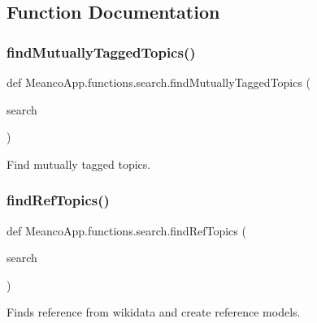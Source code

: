 \subsection{Function Documentation}
\hypertarget{namespace_meanco_app_1_1functions_1_1search_a586e968398f8f8a93016191459cacd60}{}\label{namespace_meanco_app_1_1functions_1_1search_a586e968398f8f8a93016191459cacd60} 
\subsubsection{\texorpdfstring{find\+Mutually\+Tagged\+Topics()}{findMutuallyTaggedTopics()}}
{\footnotesize\ttfamily def Meanco\+App.\+functions.\+search.\+find\+Mutually\+Tagged\+Topics (\begin{DoxyParamCaption}\item[{}]{search }\end{DoxyParamCaption})}



Find mutually tagged topics. 

\hypertarget{namespace_meanco_app_1_1functions_1_1search_ad033c051ea9ae6c4a1256ada1392ad18}{}\label{namespace_meanco_app_1_1functions_1_1search_ad033c051ea9ae6c4a1256ada1392ad18} 
\subsubsection{\texorpdfstring{find\+Ref\+Topics()}{findRefTopics()}}
{\footnotesize\ttfamily def Meanco\+App.\+functions.\+search.\+find\+Ref\+Topics (\begin{DoxyParamCaption}\item[{}]{search }\end{DoxyParamCaption})}



Finds reference from wikidata and create reference models. 

\hypertarget{namespace_meanco_app_1_1functions_1_1search_abe184d83dc97bdf6971f35c813cd2384}{}\label{namespace_meanco_app_1_1functions_1_1search_abe184d83dc97bdf6971f35c813cd2384} 
